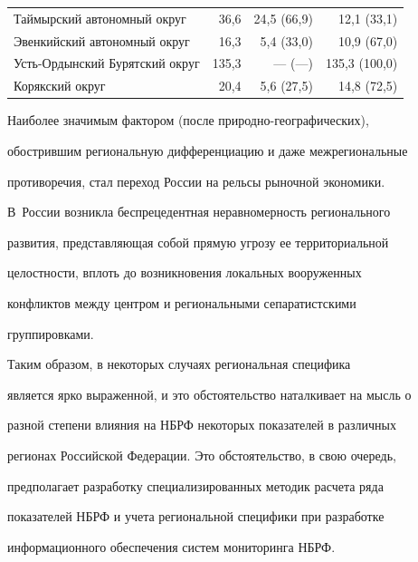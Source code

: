 \begin{table}
\begin{center}
\begin{tabular}{|l|r|r|r|}
Таймырский автономный округ&36,6&24,5 (66,9)&12,1 (33,1)\\


Эвенкийский автономный округ&16,3&5,4 (33,0)&10,9 (67,0)\\


Усть-Ордынский Бурятский округ&135,3&--- (---)&135,3 (100,0)\\


Корякский округ&20,4&5,6 (27,5)&14,8 (72,5)\\


\hline


\end{tabular}


\end{center}


\vspace*{-12pt}


\end{table}





    Наиболее значимым фактором (после природно-географических),


обострившим региональную дифференциацию и даже межрегиональные


противоречия, стал переход России на рельсы рыночной экономики.


В~России возникла беспрецедентная неравномерность регионального


развития, представляющая собой прямую угрозу ее территориальной


целостности, вплоть до возникновения локальных вооруженных


конфликтов между центром и региональными сепаратистскими


группировками.





    Таким образом, в некоторых случаях региональная специфика


является ярко выраженной, и это обстоятельство наталкивает на мысль о


разной степени влияния на НБРФ некоторых показателей в различных


регионах Российской Федерации. Это обстоятельство, в свою очередь,


предполагает разработку специализированных методик расчета ряда


показателей НБРФ и учета региональной специфики при разработке


информационного обеспечения систем мониторинга НБРФ.





